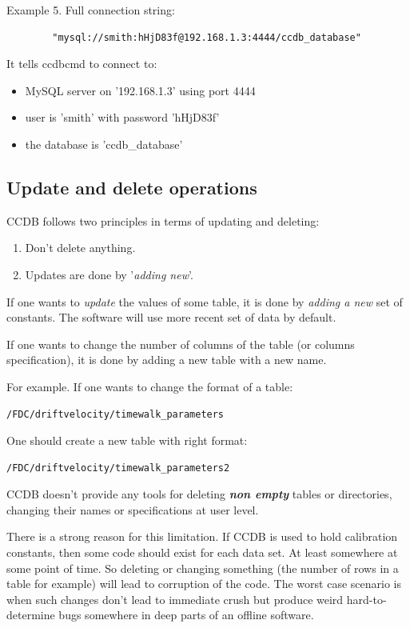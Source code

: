 \documentclass{article}
\begin{document}
Example 5. Full connection string:
\begin{verbatim}	
        "mysql://smith:hHjD83f@192.168.1.3:4444/ccdb_database"
\end{verbatim}

It tells ccdbcmd to connect to:
\begin{itemize}
  \item MySQL server  on '192.168.1.3' using port 4444
  \item user is 'smith' with password 'hHjD83f'
  \item the database is 'ccdb\_database'
\end{itemize}


\subsection{Update and delete operations}

CCDB follows two principles in terms of updating and deleting:
\begin{enumerate}
\item Don't delete anything.
\item Updates are done by '\textit{adding new}'.
\end{enumerate}

If one wants to \textit{update} the values of some table, it is done by
\textit{adding a new} set of constants. The software will use more recent set
of data by default.

If one wants to change the number of columns of the table (or columns
specification), it is done by adding a new table with a new name.

For example. If one wants to change the format of a table:
\begin{verbatim}
/FDC/driftvelocity/timewalk_parameters
\end{verbatim}
One should create a new table with right format:
\begin{verbatim}
/FDC/driftvelocity/timewalk_parameters2
\end{verbatim}

CCDB doesn't provide any tools for deleting \textbf{\textit{non empty}} tables
or directories, changing their names or specifications at user level.

There is a strong reason for this limitation.
If CCDB is used to hold calibration constants, then some code should exist for
each data set. At least somewhere at some point of time. So deleting
or changing something (the number of rows in a table for example) will lead to
corruption of the code. The worst case scenario is when such changes don't
lead to immediate crush but produce weird hard-to-determine bugs somewhere in
deep parts of an offline software.
\end{document}
